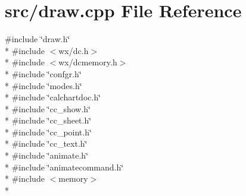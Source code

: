 \hypertarget{a00222}{\section{src/draw.cpp File Reference}
\label{a00222}
}
{\ttfamily \#include \char`\"{}draw.\-h\char`\"{}}\\*
{\ttfamily \#include $<$wx/dc.\-h$>$}\\*
{\ttfamily \#include $<$wx/dcmemory.\-h$>$}\\*
{\ttfamily \#include \char`\"{}confgr.\-h\char`\"{}}\\*
{\ttfamily \#include \char`\"{}modes.\-h\char`\"{}}\\*
{\ttfamily \#include \char`\"{}calchartdoc.\-h\char`\"{}}\\*
{\ttfamily \#include \char`\"{}cc\-\_\-show.\-h\char`\"{}}\\*
{\ttfamily \#include \char`\"{}cc\-\_\-sheet.\-h\char`\"{}}\\*
{\ttfamily \#include \char`\"{}cc\-\_\-point.\-h\char`\"{}}\\*
{\ttfamily \#include \char`\"{}cc\-\_\-text.\-h\char`\"{}}\\*
{\ttfamily \#include \char`\"{}animate.\-h\char`\"{}}\\*
{\ttfamily \#include \char`\"{}animatecommand.\-h\char`\"{}}\\*
{\ttfamily \#include $<$memory$>$}\\*
